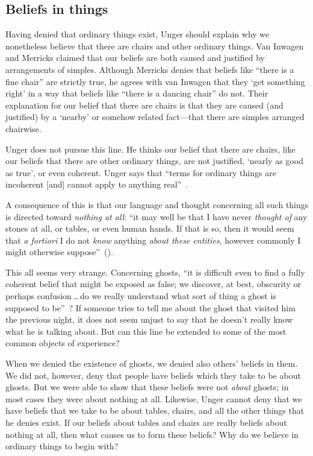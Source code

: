 \documentclass[11pt]{standalone} \newif\ifstandlone \standalonetrue
\begin{document}
\begin{spacing}{1.5}
\section{Beliefs in things}
\label{beliefs}
Having denied that ordinary things exist, Unger should explain why we
nonetheless believe that there are chairs and other ordinary things.
Van Inwagen and Merricks claimed that our beliefs are both caused and
justified by arrangements of simples.  Although Merricks denies that
beliefs like ``there is a fine chair'' are strictly true, he agrees with
van Inwagen that they `get something right' in a way that beliefs like
``there is a dancing chair'' do not.  Their explanation for our
belief that there are chairs is that they are caused (and justified)
by a `nearby' or somehow related fact---that there are simples
arranged chairwise.  

Unger does not pursue this line.  He thinks our belief that there are
chairs, like our beliefs that there are other ordinary things, are not
justified, `nearly as good as true', or even coherent.  Unger says
that ``terms for ordinary things are incoherent [and] cannot apply to
anything real''~\citep[147]{unger1979}.

A consequence of this is that our language and thought concerning all
such things is directed toward {\em nothing at all}: ``it may well be
that I have never {\em thought of} any stones at all, or tables, or
even human hands.  If that is so, then it would seem that {\em a
  fortiori} I do not {\em know} anything {\em about these entities},
however commonly I might otherwise
suppose''~(\citeyear[458]{unger1980a}).

This all seems very strange.  Concerning ghosts, ``it is difficult
even to find a fully coherent belief that might be exposed as false;
we discover, at best, obscurity or perhaps confusion\,\ldots\,do we
really understand what sort of thing a ghost is supposed to
be''~\citep[76]{stroud2000a}?  If someone tries to tell me about the
ghost that visited him the previous night, it does not seem unjust to
say that he doesn't really know what he is talking about.  But can
this line be extended to some of the most common objects of
experience?

When we denied the existence of ghosts, we denied also others' beliefs
in them.  We did not, however, deny that people have beliefs which
they take to be about ghosts.  But we were able to show that these
beliefs were not {\em about} ghosts; in most cases they were about
nothing at all.  Likewise, Unger cannot deny that we have beliefs that
we take to be about tables, chairs, and all the other things that he
denies exist.  If our beliefs about tables and chairs are really
beliefs about nothing at all, then what causes us to form these
beliefs?  Why do we believe in ordinary things to begin with?


\end{spacing}
\end{document}
